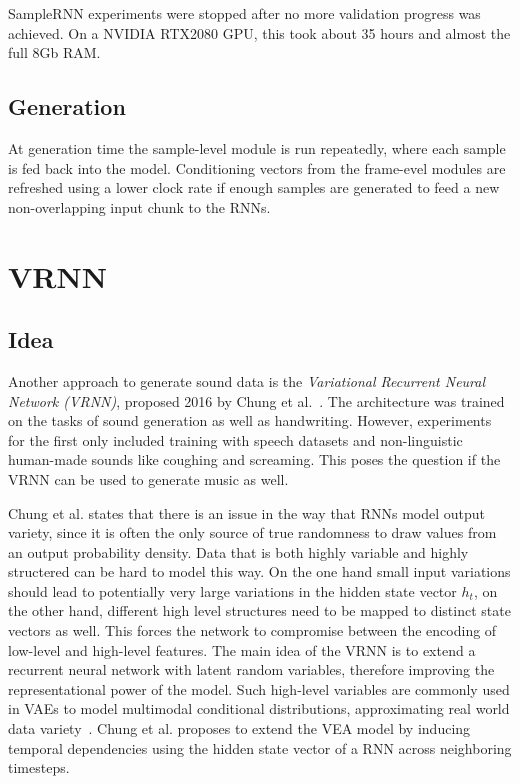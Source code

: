 \documentclass[12pt]{article}
\begin{document}
SampleRNN experiments were stopped after no more validation progress was achieved.
On a NVIDIA RTX2080 GPU, this took about 35 hours and almost the full 8Gb RAM.




\subsection{Generation}
At generation time the sample-level module is run repeatedly, where each sample is fed back into the model.
Conditioning vectors from the frame-evel modules are refreshed using a lower clock rate if enough samples are generated to feed a new non-overlapping input chunk to the RNNs.





\section{VRNN}
\subsection{Idea}
Another approach to generate sound data is the \emph{Variational Recurrent Neural Network (VRNN)}, proposed 2016 by Chung et al.~\cite{chung2015recurrent}.
The architecture was trained on the tasks of sound generation as well as handwriting.
However, experiments for the first only included training with speech datasets and non-linguistic human-made sounds like coughing and screaming.
This poses the question if the VRNN can be used to generate music as well.

Chung et al. states that there is an issue in the way that RNNs model output variety, since it is often the only source of true randomness to draw values from an output probability density.
Data that is both highly variable and highly structered can be hard to model this way.
On the one hand small input variations should lead to potentially very large variations in the hidden state vector $h_t$, on the other hand, different high level structures need to be mapped to distinct state vectors as well.
This forces the network to compromise between the encoding of low-level and high-level features.
The main idea of the VRNN is to extend a recurrent neural network with latent random variables, therefore improving the representational power of the model.
Such high-level variables are commonly used in VAEs to model multimodal conditional distributions, approximating real world data variety~\cite{kingma2013auto}.
Chung et al. proposes to extend the VEA model by inducing temporal dependencies using the hidden state vector of a RNN across neighboring timesteps.
\end{document}
